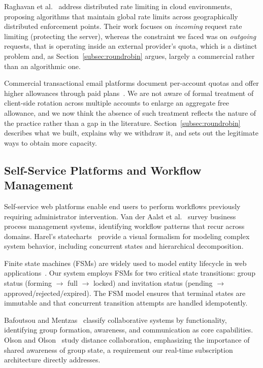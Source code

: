 \documentclass[11pt,a4paper]{article}
\theoremstyle{plain}
\theoremstyle{definition}
\theoremstyle{remark}
\begin{document}
Raghavan et al.~\cite{raghavan2007} address distributed rate limiting in cloud environments, proposing algorithms that maintain global rate limits across geographically distributed enforcement points. Their work focuses on \emph{incoming} request rate limiting (protecting the server), whereas the constraint we faced was on \emph{outgoing} requests, that is operating inside an external provider's quota, which is a distinct problem and, as Section~\ref{subsec:roundrobin} argues, largely a commercial rather than an algorithmic one.

Commercial transactional email platforms document per-account quotas and offer higher allowances through paid plans~\cite{brevo-limits}. We are not aware of formal treatment of client-side rotation across multiple accounts to enlarge an aggregate free allowance, and we now think the absence of such treatment reflects the nature of the practice rather than a gap in the literature. Section~\ref{subsec:roundrobin} describes what we built, explains why we withdraw it, and sets out the legitimate ways to obtain more capacity.

\subsection{Self-Service Platforms and Workflow Management}

Self-service web platforms enable end users to perform workflows previously requiring administrator intervention. Van der Aalst et al.~\cite{vanderaalst2003} survey business process management systems, identifying workflow patterns that recur across domains. Harel's statecharts~\cite{harel1987} provide a visual formalism for modeling complex system behavior, including concurrent states and hierarchical decomposition.

Finite state machines (FSMs) are widely used to model entity lifecycle in web applications~\cite{hopcroft1971}. Our system employs FSMs for two critical state transitions: group status (forming $\rightarrow$ full $\rightarrow$ locked) and invitation status (pending $\rightarrow$ approved/rejected/expired). The FSM model ensures that terminal states are immutable and that concurrent transition attempts are handled idempotently.

Bafoutsou and Mentzas~\cite{bafoutsou2002} classify collaborative systems by functionality, identifying group formation, awareness, and communication as core capabilities. Olson and Olson~\cite{olson2000} study distance collaboration, emphasizing the importance of shared awareness of group state, a requirement our real-time subscription architecture directly addresses.
\end{document}
